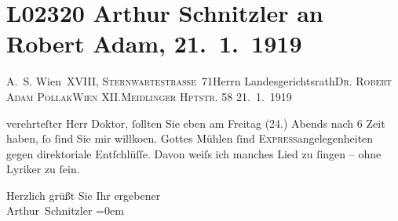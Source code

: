 

\section[Arthur Schnitzler an Robert Adam, 21. 1. 1919]{L02320 Arthur Schnitzler an Robert Adam, 21. 1. 1919}
\nopagebreak{}
\rehead{ }\normalsize\beginnumbering{}
\toendnotes[C]{\smallbreak\pagebreak[2]}
\pstart{}{\pb}A. S. Wien XVIII, \textsc{Sternwartestrasse} 71\pend{}{\bigskip}\pstart{}Herrn Landesgerichtsrath\pend{}\pstart{}\textsc{Dr. Robert Adam Pollak}\pend{}\pstart{}\textsc{Wien} XII.\pend{}\pstart{}\textsc{Meidlinger Hptstr.} 58\pend{}{\bigskip}\vspace{1em}
\pstart
           \raggedleft{}{\pb}21. 1. 1919\pend
           
\pstart{}verehrteſter Herr Doktor,\pend\vspace{0.5em}
\pstart
           ſollten Sie eben am Freitag (24.) Abends nach
                  6 Zeit haben, ſo ſind Sie mir willko{\geminationm}en.
               Gottes Mühlen ſind \textsc{Express}angelegenheiten gegen
               direktoriale Entſchlüſſe. Davon weiſs ich manches Lied zu ſingen – ohne Lyriker zu
               ſein.\pend
           
\pstart
           Herzlich grüßt Sie Ihr ergebener{\\[\baselineskip]}\spacefill\mbox{Arthur Schnitzler}\pend
           \leftskip=0em{}\endnumbering{}  
      